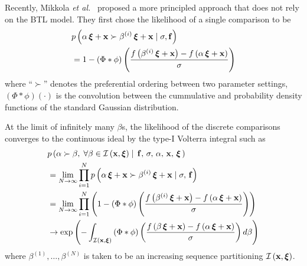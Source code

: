 Recently, Mikkola \textit{et al.}~\cite{pmlr-v119-mikkola20a} proposed a more principled approach that does not rely on the BTL model.
They first chose the likelihood of a single comparison to be 
\begin{align}
  &p\left(\alpha \, \bm{\xi} + \mathbf{x} \succ \beta^{(i)} \, \bm{\xi} + \mathbf{x} \mid \sigma, \mathbf{f} \right) \\
  &= 1 - \left(\Phi * \phi \right)\left( \frac{ f\left(\beta^{(i)} \, \bm{\xi} + \mathbf{x} \right) - f\left(\alpha \, \bm{\xi} + \mathbf{x} \right) }{\sigma} \right)
\end{align}
{\noindent}where ``\(\succ\)'' denotes the preferential ordering between two parameter settings, \(\left(\Phi*\phi\right)\left(\cdot\right)\) is the convolution between the cummulative and probability density functions of the standard Gaussian distribution. 

At the limit of infinitely many \(\beta\)s, the likelihood of the discrete comparisons converges to the continuous ideal by the type-I Volterra integral such as
{\small
\begin{align}
  &p\left(\alpha \succ \beta,\; \forall \beta \in \mathcal{I}\left(\mathbf{x}, \bm{\xi}\right) \mid\, \mathbf{f},\, \sigma,\, \alpha,\, \mathbf{x},\, \bm{\xi}\,\right) \\
  &= \lim_{N \rightarrow \infty} \prod^{N}_{i=1} p\left(\alpha \, \bm{\xi} + \mathbf{x} \succ \beta^{(i)} \, \bm{\xi} + \mathbf{x} \mid \sigma,\, \mathbf{f} \right) \\
  &= \lim_{N \rightarrow \infty} \prod^{N}_{i=1} \left(  1 - \left(\Phi * \phi \right)\left( \frac{ f\left(\beta^{(i)} \, \bm{\xi} + \mathbf{x} \right) - f\left(\alpha \, \bm{\xi} + \mathbf{x} \right) }{\sigma} \right) \right) \\
  &\rightarrow \exp\left(  - \int_{\mathcal{I}\left(\mathbf{x}, \bm{\xi}\right)} \left(\Phi * \phi \right) \left( \frac{ f\left(\beta \, \bm{\xi} + \mathbf{x} \right) - f\left(\alpha \, \bm{\xi} + \mathbf{x} \right) }{\sigma} \right) d\beta \right)
\end{align}
}%
%
{\noindent}where \(\beta^{(1)}, \ldots, \beta^{(N)}\) is taken to be an increasing sequence partitioning \(\mathcal{I\left(\mathbf{x}, \bm{\xi}\right)}\).

